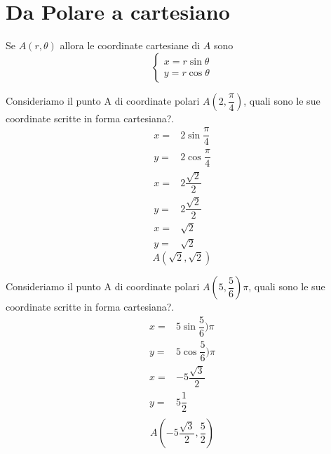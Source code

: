 \section{Da Polare a cartesiano}
Se $A(r,\theta)$ allora le coordinate cartesiane di $A$ sono\[\begin{cases}
x=r\sin\theta\\
y=r\cos\theta 
\end{cases} \]
\begin{esempiot}{}{} Consideriamo il punto A di coordinate polari $A(2,\dfrac{\pi}{4})$, quali sono le sue coordinate scritte in forma cartesiana?.
	\begin{align*}
	x=&2\sin\dfrac{\pi}{4}\\
	y=&2\cos\dfrac{\pi}{4}\\
	x=&2\dfrac{\sqrt{2}}{2}\\
	y=&2\dfrac{\sqrt{2}}{2}\\
	x=&\sqrt{2}\\
	y=&\sqrt{2}
	\end{align*}
	\[A(\sqrt{2},\sqrt{2}) \]
\end{esempiot}
\begin{esempiot}{}{} Consideriamo il punto A di coordinate polari $A(5,\dfrac{5}{6})\pi$, quali sono le sue coordinate scritte in forma cartesiana?.
	\begin{align*}
	x=&5\sin\dfrac{5}{6})\pi\\
	y=&5\cos\dfrac{5}{6})\pi\\
	x=&-5\dfrac{\sqrt{3}}{2}\\
	y=&5\dfrac{1}{2}\\
		\end{align*}
	\[A(-5\dfrac{\sqrt{3}}{2},\dfrac{5}{2}) \]
\end{esempiot}